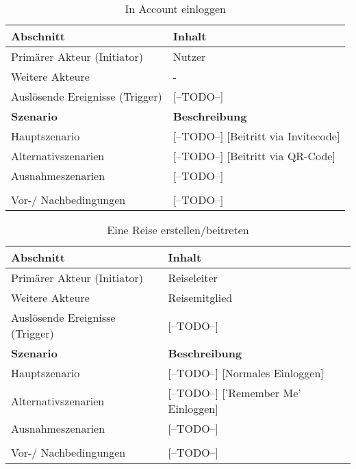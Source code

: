 \begin{table}[H]
\caption{In Account einloggen}
\begin{tabularx}{0.95\textwidth}{ |X|X| }
\hline
\rowcolor{gray} \textbf{Abschnitt} & \textbf{Inhalt} \\
\hline
	Primärer Akteur (Initiator) & Nutzer \\
\hline
	Weitere Akteure & - \\
\hline
	Auslösende Ereignisse (Trigger) & [--TODO--] \\
\hline
\rowcolor{lightgray} \textbf{Szenario} & \textbf{Beschreibung} \\
\hline
	Hauptszenario & [--TODO--] [Beitritt via Invitecode] \\
\hline
  	Alternativszenarien & [--TODO--] [Beitritt via QR-Code]\\
\hline
  	Ausnahmeszenarien & [--TODO--] \\
\hline
\rowcolor{lightgray} & \\
\hline
  	Vor-/ Nachbedingungen & [--TODO--] \\
\hline
\end{tabularx}
\end{table}


\begin{table}[H]
\caption{Eine Reise erstellen/beitreten}
\begin{tabularx}{0.95\textwidth}{ |X|X| }
\hline
\rowcolor{gray} \textbf{Abschnitt} & \textbf{Inhalt} \\
\hline
	Primärer Akteur (Initiator) & Reiseleiter \\
\hline
	Weitere Akteure & Reisemitglied \\
\hline
	Auslösende Ereignisse (Trigger) & [--TODO--] \\
\hline
\rowcolor{lightgray} \textbf{Szenario} & \textbf{Beschreibung} \\
\hline
	Hauptszenario & [--TODO--] [Normales Einloggen] \\
\hline
  	Alternativszenarien & [--TODO--] ['Remember Me' Einloggen]\\
\hline
  	Ausnahmeszenarien & [--TODO--] \\
\hline
\rowcolor{lightgray} & \\
\hline
  	Vor-/ Nachbedingungen & [--TODO--] \\
\hline
\end{tabularx}
\end{table}


